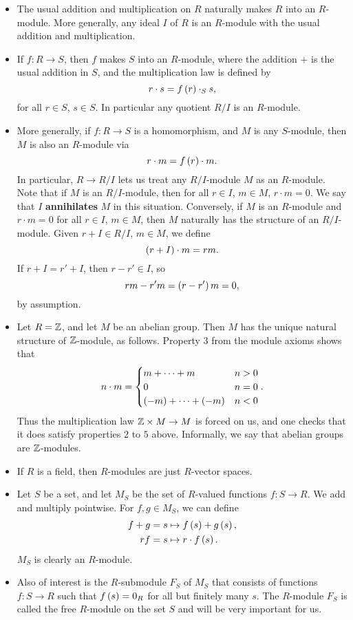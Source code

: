 \begin{example2}
\hfill
\begin{itemize}
\item The usual addition and multiplication on $ R $ naturally makes $ R $ into an $ R $-module. More generally, any ideal $ I $ of $ R $ is an $ R $-module with the usual addition and multiplication.
\item If $ f : R \to S $, then $ f $ makes $ S $ into an $ R $-module, where the addition $ + $ is the usual addition in $ S $, and the multiplication law is defined by
$$ r \cdot s = f\left( r \right) \cdot_S s, $$
for all $ r \in S $, $ s \in S $. In particular any quotient $ R / I $ is an $ R $-module.
\item More generally, if $ f : R \to S $ is a homomorphism, and $ M $ is any $ S $-module, then $ M $ is also an $ R $-module via
$$ r \cdot m = f\left( r \right) \cdot m. $$
In particular, $ R \to R / I $ lets us treat any $ R / I $-module $ M $ as an $ R $-module. Note that if $ M $ is an $ R / I $-module, then for all $ r \in I $, $ m \in M $, $ r \cdot m = 0 $. We say that $ I $ \textbf{annihilates} $ M $ in this situation. Conversely, if $ M $ is an $ R $-module and $ r \cdot m = 0 $ for all $ r \in I $, $ m \in M $, then $ M $ naturally has the structure of an $ R / I $-module. Given $ r + I \in R / I $, $ m \in M $, we define
$$ \left( r + I \right) \cdot m = rm. $$
If $ r + I = r' + I $, then $ r - r' \in I $, so
$$ rm - r'm = \left( r - r' \right)m = 0, $$
by assumption.
\item Let $ R = \mathbb{Z} $, and let $ M $ be an abelian group. Then $ M $ has the unique natural structure of $ \mathbb{Z} $-module, as follows. Property $ 3 $ from the module axioms shows that
$$ n \cdot m = \begin{cases}
m + \dots + m & n > 0 \\
0 & n = 0 \\
\left( -m \right) + \dots + \left( -m \right) & n < 0
\end{cases}. $$
Thus the multiplication law $ \mathbb{Z} \times M \to M $ is forced on us, and one checks that it does satisfy properties $ 2 $ to $ 5 $ above. Informally, we say that abelian groups are $ \mathbb{Z} $-modules.
\item If $ R $ is a field, then $ R $-modules are just $ R $-vector spaces.
\item Let $ S $ be a set, and let $ M_S $ be the set of $ R $-valued functions $ f : S \to R $. We add and multiply pointwise. For $ f, g \in M_S $, we can define
\begin{align*}
f + g & = s \mapsto f\left( s \right) + g\left( s \right), \\
rf & = s \mapsto r \cdot f\left( s \right).
\end{align*}
$ M_S $ is clearly an $ R $-module.
\item Also of interest is the $ R $-submodule $ F_S $ of $ M_S $ that consists of functions $ f : S \to R $ such that $ f\left( s \right) = 0_R $ for all but finitely many $ s $. The $ R $-module $ F_S $ is called the free $ R $-module on the set $ S $ and will be very important for us.
\end{itemize}
\end{example2}

